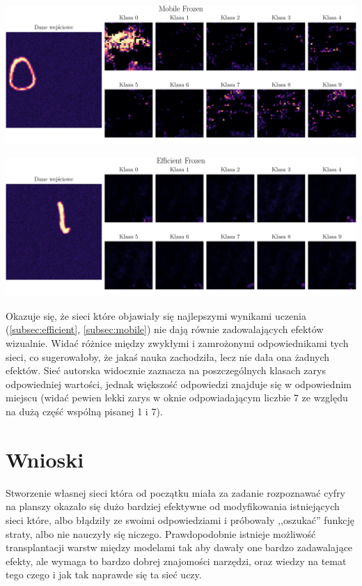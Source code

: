 \documentclass[10pt]{article}
\begin{document}
\begin{center}
  \includegraphics[width=0.9\linewidth]{figures/mobile_frozen.pdf}
  \label{fig:mobile_frozen_resp}
\end{center}

\begin{center}
  \includegraphics[width=0.9\linewidth]{figures/efficient_frozen.pdf}
  \label{fig:efficient_frozen_resp}
\end{center}

\newpage
Okazuje się, że sieci które objawiały się najlepszymi wynikami uczenia (\ref{subsec:efficient}, \ref{subsec:mobile}) nie dają równie zadowalających efektów wizualnie. Widać różnice między zwykłymi i zamrożonymi odpowiednikami tych sieci, co sugerowałoby, że jakaś nauka zachodziła, lecz nie dała ona żadnych efektów. Sieć autorska widocznie zaznacza na poszczególnych klasach zarys odpowiedniej wartości, jednak większość odpowiedzi znajduje się w odpowiednim miejscu (widać pewien lekki zarys w oknie odpowiadającym liczbie 7 ze względu na dużą część wspólną pisanej 1 i 7).

\section{Wnioski}
Stworzenie własnej sieci która od początku miała za zadanie rozpoznawać cyfry na planszy okazało się dużo bardziej efektywne od modyfikowania istniejących sieci które, albo błądziły ze swoimi odpowiedziami i próbowały ,,oszukać'' funkcję straty, albo nie nauczyły się niczego. Prawdopodobnie istnieje możliwość transplantacji warstw między modelami tak aby dawały one bardzo zadawalające efekty, ale wymaga to bardzo dobrej znajomości narzędzi, oraz wiedzy na temat tego czego i jak tak naprawde się ta sieć uczy.
\end{document}
